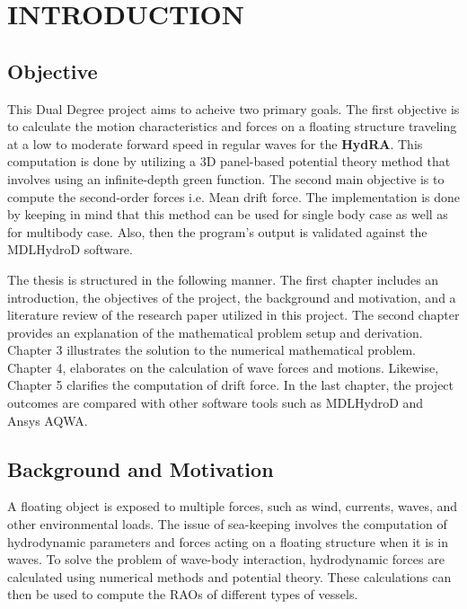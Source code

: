 \chapter{INTRODUCTION}

\section{Objective}
This Dual Degree project aims to acheive two primary goals. The first objective is to calculate 
the motion characteristics and forces on a floating structure traveling at a low to moderate 
forward speed in regular waves for the {\bf HydRA}. This computation is done by utilizing a 3D 
panel-based potential theory method that involves using an infinite-depth green function. 
The second main objective is to compute the second-order forces i.e. Mean drift force. 
The implementation is done by keeping in mind that this method can be used for single body case 
as well as for multibody case. Also, then the program's output is validated against 
the MDLHydroD software.

The thesis is structured in the following manner. The first chapter includes an introduction, 
the objectives of the project, the background and motivation, and a literature review of the 
research paper utilized in this project. The second chapter provides an explanation of the 
mathematical problem setup and derivation. Chapter 3 illustrates the solution to the numerical 
mathematical problem. Chapter 4, elaborates on the calculation of wave 
forces and motions. Likewise, Chapter 5 clarifies 
the computation of drift force. In the last chapter, the project outcomes are compared with 
other software tools such as MDLHydroD and Ansys AQWA.


\section{Background and Motivation}
A floating object is exposed to multiple forces, such as wind, currents, waves, and other 
environmental loads. The issue of sea-keeping involves the computation of hydrodynamic 
parameters and forces acting on a floating structure when it is in waves. To solve the 
problem of wave-body interaction, hydrodynamic forces are calculated using numerical 
methods and potential theory. These calculations can then be used to compute the RAOs 
of different types of vessels.

